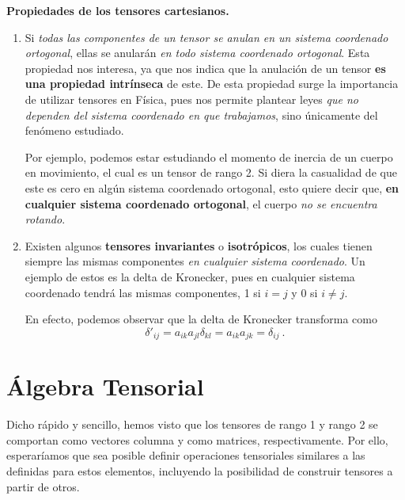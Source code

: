 \begin{propiedad}
    \textbf{Propiedades de los tensores cartesianos.}

    \begin{enumerate}
        \item Si \emph{todas las componentes de un tensor se anulan en un sistema coordenado ortogonal}, ellas se anularán \emph{en todo sistema coordenado ortogonal}.  Esta propiedad nos interesa, ya que nos indica que la anulación de un tensor \textbf{es una propiedad intrínseca} de este. De esta propiedad surge la importancia de utilizar tensores en Física, pues nos permite plantear leyes \emph{que no dependen del sistema coordenado en que trabajamos}, sino únicamente del fenómeno estudiado.
        
        Por ejemplo, podemos estar estudiando el momento de inercia de un cuerpo en movimiento, el cual es un tensor de rango 2. Si diera la casualidad de que este es cero en algún sistema coordenado ortogonal, esto quiere decir que, \textbf{en cualquier sistema coordenado ortogonal}, el cuerpo \emph{no se encuentra rotando}.
    
        \item Existen algunos \textbf{tensores invariantes} o \textbf{isotrópicos}, los cuales tienen siempre las mismas componentes \emph{en cualquier sistema coordenado}. Un ejemplo de estos es la delta de Kronecker, pues en cualquier sistema coordenado tendrá las mismas componentes, 1 si $i=j$ y 0 si $i\neq j$.
        
        En efecto, podemos observar que la delta de Kronecker transforma como
        \begin{equation}
            \delta'_{ij} = a_{ik} a_{jl} \delta_{kl} = a_{ik} a_{jk} = \delta_{ij} \ .
        \end{equation}
    \end{enumerate}
\end{propiedad}



\section{Álgebra Tensorial}

Dicho rápido y sencillo, hemos visto que los tensores de rango 1 y rango 2 se comportan como vectores columna y como matrices, respectivamente. Por ello, esperaríamos que sea posible definir operaciones tensoriales similares a las definidas para estos elementos, incluyendo la posibilidad de construir tensores a partir de otros.

